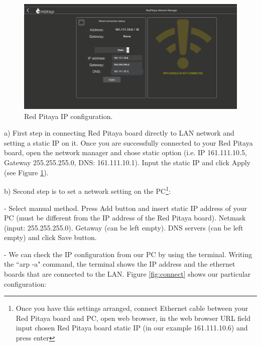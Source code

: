 \documentclass[12pt]{extarticle}
\begin{document}
\begin{itemize}
\begin{figure}[!tp]
	\begin{center}
		\includegraphics[width=1\textwidth]{images2/connect-11} 
		\caption{Red Pitaya IP configuration.}
		\label{fig:ip}
	\end{center}
\end{figure}

a) First step in connecting Red Pitaya board directly to LAN network and setting a static IP on it. Once you are successfully connected to your Red Pitaya board, open the network manager and chose static option (i.e. IP 161.111.10.5, Gateway 255.255.255.0, DNS: 161.111.10.1). Input the static IP and click Apply (see Figure \ref{fig:ip}).

b) Second step is to set a network setting on the PC\footnote{Once you have this settings arranged, connect Ethernet cable between your Red Pitaya board and PC, open web browser, in the web browser URL field input chosen Red Pitaya board static IP (in our example 161.111.10.6) and press enter}:

- Select manual method. Press Add button and insert static IP address of your PC (must be different from the IP address of the Red Pitaya board). Netmask (input: 255.255.255.0). Getaway (can be left empty). DNS servers (can be left empty) and click Save button.

- We can check the IP configuration from our PC by using the terminal. Writing the ``arp -a" command, the terminal shows the IP address and the ethernet boards that are connected to the LAN. Figure \ref{fig:connect} shows our particular configuration: 

\end{itemize}
\end{document}
